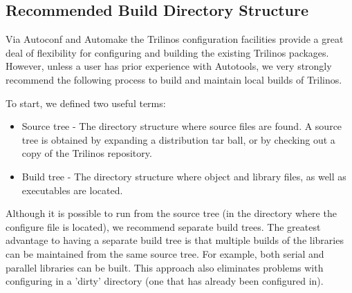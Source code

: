 \subsection{Recommended Build Directory Structure}
\label{subsect:BuildDirectoryStructure}

Via Autoconf and Automake the Trilinos configuration facilities
provide a great deal of flexibility for configuring and building the
existing Trilinos packages.  However, unless a user has prior experience
with Autotools, we very strongly recommend the following process to build and
maintain local builds of Trilinos.

To start, we defined two useful terms:
\begin{itemize}
\item Source tree - The directory structure where source files are found.  A source
tree is obtained by expanding a distribution tar ball, or by checking
out a copy of the Trilinos repository.
\item Build tree - The directory structure where object and library files, as
well as executables are located.
\end{itemize}

\begin{minipage}[c]{\textwidth}

\begin{minipage}[l]{.6\textwidth}

Although it is possible to run  from the source tree (in
the directory where the configure file is located), we recommend
separate build trees.  The greatest advantage to having a separate
build tree is that multiple builds of the libraries can be maintained
from the same source tree.  For example, both serial and parallel libraries
can be built.
This approach also eliminates problems with configuring in a 'dirty'
directory (one that has already been configured in).
\end{minipage}\hfill
{}
\end{minipage}

